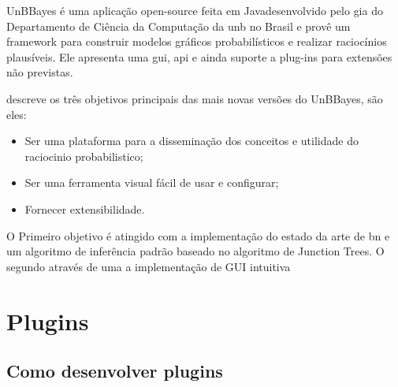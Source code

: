 UnBBayes é uma aplicação open-source feita em Java\texttrademark desenvolvido pelo \gls{gia} do Departamento de Ciência da Computação da \gls{unb} no Brasil e provê um framework para construir modelos gráficos probabilísticos e realizar raciocínios plausíveis. Ele apresenta uma \gls{gui}, \gls{api} e ainda suporte a plug-ins para extensões não previstas.

 descreve os três objetivos principais das mais novas versões do UnBBayes, são eles:
\begin{itemize}
	\item Ser uma plataforma para a disseminação dos conceitos e utilidade do raciocinio probabilistico;
	\item Ser uma ferramenta visual fácil de usar e configurar;
	\item Fornecer extensibilidade.
\end{itemize}
O Primeiro objetivo é atingido com a implementação do estado da arte de \gls{bn} e um algoritmo de inferência padrão baseado no algoritmo de Junction Trees. O segundo através de uma a implementação de GUI intuitiva 

\section{Plugins}

\subsection{Como desenvolver plugins}